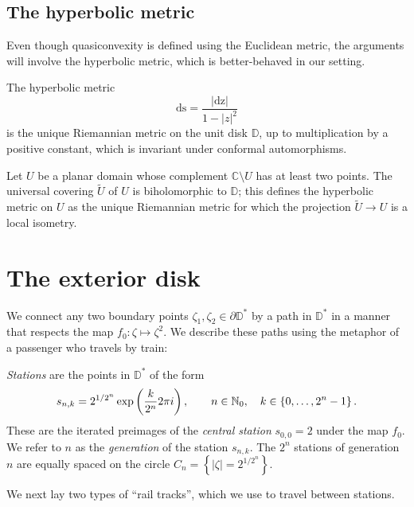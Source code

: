 \subsection{The hyperbolic metric}
Even though quasiconvexity is defined using the Euclidean metric, 
the arguments will involve the hyperbolic metric, which is better-behaved in our setting.

\begin{theorem}
	The hyperbolic metric
	$$\mathrm{ds} = \frac {|\mathrm {dz}|}{1-|z|^2} $$
	is the unique Riemannian metric on the unit disk $\mathbb D$, up to multiplication
	by a positive constant, which is invariant under conformal automorphisms.
\end{theorem}

\begin{theorem}\label{thm:criterion-hyperbolic-domain}
	Let $U$ be a planar domain whose complement $\mathbb C \setminus U$ has at least two points.
	The universal covering $\tilde U$ of $U$ is biholomorphic to $\mathbb D$; this defines the 
	hyperbolic metric on $U$ as the unique Riemannian metric for which the projection 
	$\tilde U \to U$ is a local isometry.
\end{theorem}

\section{The exterior disk}

We connect any two boundary points $\zeta_1, \zeta_2 \in \partial \mathbb D^*$ by a path in $\mathbb D^*$ in a manner that respects the map 
$f_0: \zeta \mapsto \zeta^2$.
We describe these paths using the metaphor of a passenger who travels by train:

\begin{definition}
\emph{Stations} are the points in $\mathbb D ^*$ of the form 
$$
s_{n,k}=2^{1/2^{n}} \exp\left(\frac{k}{2^{n}}2\pi i\right),\qquad n\in\mathbb{N}_{0},\quad k\in\left\{ 0,\ldots,2^{n}-1\right\}.
$$ 
These are the iterated preimages of the \emph{central station} $s_{0,0} = 2$ under the map $f_{0}$.
We refer to $n$ as the \emph{generation} of the station $s_{n,k}$. 
The $2^{n}$ stations of generation $n$ are equally spaced on the circle $C_{n}=\left\{ \left|\zeta\right|=2^{1/2^{n}}\right\} $. 
\end{definition}

We next lay two types of \enquote{rail tracks}, which we use to travel between stations.

